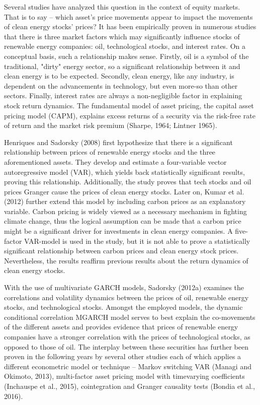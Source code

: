 \documentclass[11pt]{article}
\begin{document}
Several studies have analyzed this question in the context of equity markets. That is to say -- which asset's price movements appear to impact the movements of clean energy stocks' prices? It has been empirically proven in numerous studies that there is three market factors which may significantly influence stocks of renewable energy companies: oil, technological stocks, and interest rates. On a conceptual basis, such a relationship makes sense. Firstly, oil is a symbol of the traditional, "dirty" energy sector, so a significant relationship between it and clean energy is to be expected. Secondly, clean energy, like any industry, is dependent on the advancements in technology, but even more-so than other sectors. Finally, interest rates are always a non-negligible factor in explaining stock return dynamics. The fundamental model of asset pricing, the capital asset pricing model (CAPM), explains excess returns of a security via the risk-free rate of return and the market risk premium (Sharpe, 1964; Lintner 1965).
\newline

Henriques and Sadorsky (2008) first hypothesize that there is a significant relationship between prices of renewable energy stocks and the three aforementioned assets. They develop and estimate a four-variable vector autoregressive model (VAR), which yields back statistically significant results, proving this relationship. Additionally, the study proves that tech stocks and oil prices Granger cause the prices of clean energy stocks. Later on, Kumar et al. (2012) further extend this model by including carbon prices as an explanatory variable. Carbon pricing is widely viewed as a necessary mechanism in fighting climate change, thus the logical assumption can be made that a carbon price might be a significant driver for investments in clean energy companies. A five-factor VAR-model is used in the study, but it is not able to prove a statistically significant relationship between carbon prices and clean energy stock prices. Nevertheless, the results reaffirm previous results about the return dynamics of clean energy stocks.
\newline

With the use of multivariate GARCH models, Sadorsky (2012a) examines the correlations and volatility dynamics between the prices of oil, renewable energy stocks, and technological stocks. Amongst the employed models, the dynamic conditional correlation MGARCH model serves to best explain the co-movements of the different assets and provides evidence that prices of renewable energy companies have a stronger correlation with the prices of technological stocks, as opposed to those of oil. The interplay between these securities has further been proven in the following years by several other studies each of which applies a different econometric model or technique -- Markov switching VAR (Managi and Okimoto, 2013), multi-factor asset pricing model with timevarying coefficients (Inchauspe et al., 2015), cointegration and Granger causality tests (Bondia et al., 2016).
\newline
\end{document}
